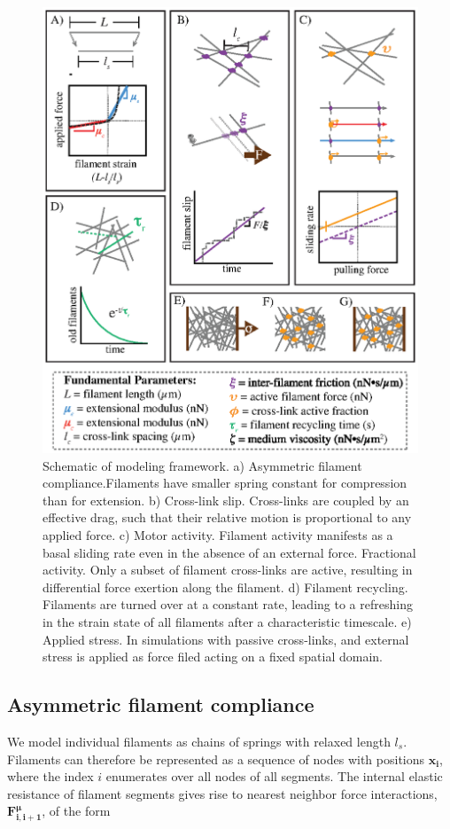 \begin{figure}[H]
	\centering
	\includegraphics[width=0.8\hsize]{active/figures/Fig1}
	\caption{\label{fig:model_overview} Schematic of modeling framework. a) Asymmetric filament compliance.Filaments have smaller spring constant for compression than for extension. b) Cross-link slip. Cross-links are coupled by an effective drag, such that their relative motion is
		proportional to any applied force. c) Motor activity. Filament activity manifests as a basal sliding rate even in the absence of an external force. Fractional activity. Only a subset of filament cross-links are active, resulting in differential force exertion along the filament. d) Filament recycling. Filaments are turned over at a constant rate, leading to a refreshing in the strain state of all filaments after a characteristic timescale. e) Applied stress. In simulations with passive cross-links, and external stress is applied as force filed acting on a fixed spatial domain.}
\end{figure}

\subsection{Asymmetric filament compliance}
We model individual filaments as chains of springs with relaxed length $l_s$.  Filaments can therefore be represented as a sequence of nodes with positions $\mathbf{x_i}$, where the index $i$ enumerates over all nodes of all segments.  The internal elastic resistance of filament segments gives rise to nearest neighbor force interactions, $\mathbf{F^{\mu}_{i,i+1}}$, of the form

